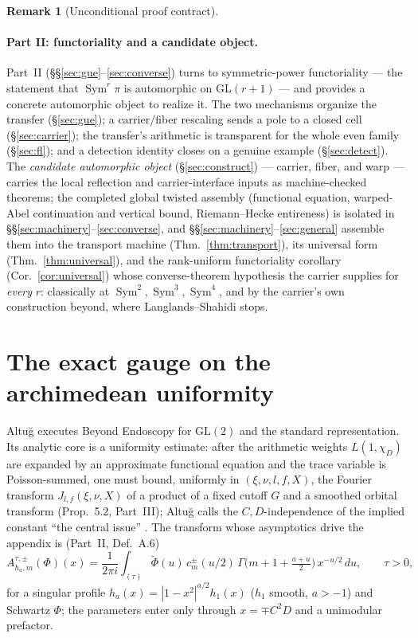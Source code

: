 \documentclass[11pt]{article}
\theoremstyle{definition}
\newtheorem{remark}[theorem]{Remark}
\newcommand{\wt}[1]{\widetilde{#1}}
\newcommand{\Sym}{\operatorname{Sym}}
\begin{document}
\begin{remark}[Unconditional proof contract]
\begin{enumerate}
\paragraph{Part II: functoriality and a candidate object.} Part~II
(\S\S\ref{sec:gue}--\ref{sec:converse}) turns to symmetric-power functoriality --- the statement that
$\Sym^r\pi$ is automorphic on $\mathrm{GL}(r+1)$ --- and provides a concrete automorphic object to
realize it. The two mechanisms organize the transfer (\S\ref{sec:gue}); a carrier/fiber rescaling
sends a pole to a closed cell (\S\ref{sec:carrier}); the transfer's arithmetic is transparent for the
whole even family (\S\ref{sec:fl}); and a detection identity closes on a genuine example
(\S\ref{sec:detect}). The \emph{candidate automorphic object} (\S\ref{sec:construct}) --- carrier,
fiber, and warp --- carries the local reflection and carrier-interface inputs as machine-checked theorems;
the completed global twisted assembly (functional equation, warped-Abel continuation and vertical bound,
Riemann--Hecke entireness) is isolated in \S\S\ref{sec:machinery}--\ref{sec:converse}, and
\S\S\ref{sec:machinery}--\ref{sec:general} assemble them into the transport machine (Thm.~\ref{thm:transport}),
its universal form (Thm.~\ref{thm:universal}), and the rank-uniform functoriality corollary
(Cor.~\ref{cor:universal}) whose converse-theorem hypothesis the carrier supplies for \emph{every} $r$:
classically at $\Sym^2,\Sym^3,\Sym^4$, and by the carrier's own construction beyond, where Langlands--Shahidi
stops.

\section{The exact gauge on the archimedean uniformity}\label{sec:gauge}

Altu\u{g} \cite{AltI,AltII,AltIII} executes Beyond Endoscopy for $\mathrm{GL}(2)$ and the standard
representation. Its analytic core is a uniformity estimate: after the arithmetic weights $L(1,\chi_D)$
are expanded by an approximate functional equation and the trace variable is Poisson-summed, one must
bound, uniformly in $(\xi,\nu,l,f,X)$, the Fourier transform $J_{l,f}(\xi,\nu,X)$ of a product of a
fixed cutoff $G$ and a smoothed orbital transform (Prop.~5.2, Part~III); Altu\u{g} calls the
$C,D$-independence of the implied constant ``the central issue'' \cite[App.~A]{AltII}. The transform
whose asymptotics drive the appendix is (Part~II, Def.~A.6)
\begin{equation}\label{eq:A6}
  A^{\tau,\pm}_{h_a,m}(\Phi)(x)=\frac{1}{2\pi i}\int_{(\tau)}\wt\Phi(u)\,c^{\pm}_m(u/2)\,
    \Gamma\!\Big(m+1+\tfrac{a+u}{2}\Big)\,x^{-u/2}\,du,\qquad \tau>0,
\end{equation}
for a singular profile $h_a(x)=|1-x^2|^{a/2}h_1(x)$ ($h_1$ smooth, $a>-1$) and Schwartz $\Phi$; the
parameters enter only through $x=\mp C^2D$ and a unimodular prefactor.


\end{enumerate}
\end{remark}
\end{document}
